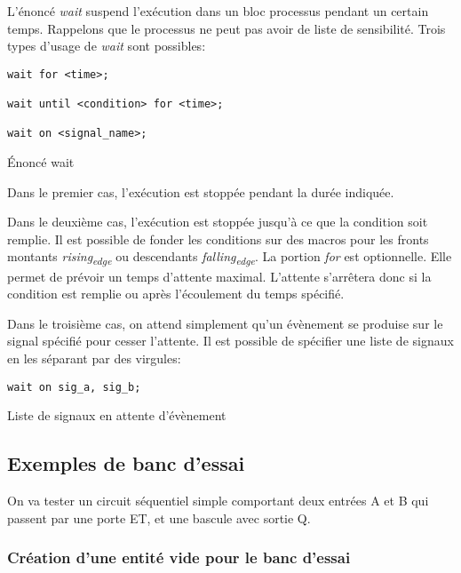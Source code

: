 \documentclass[11pt]{article}
\begin{document}
\begin{enumerate}
L'énoncé \emph{wait} suspend l'exécution dans un bloc processus pendant un
certain temps. Rappelons que le processus ne peut pas avoir de liste
de sensibilité. Trois types d'usage de \emph{wait} sont possibles:

\begin{listing}[htbp]
\begin{verbatim}
wait for <time>; 

wait until <condition> for <time>;

wait on <signal_name>;
\end{verbatim}
\caption{Énoncé wait}
\end{listing}

Dans le premier cas, l'exécution est stoppée pendant la durée
indiquée.

Dans le deuxième cas, l'exécution est stoppée jusqu'à ce que la
condition soit remplie. Il est possible de fonder les conditions sur
des macros pour les fronts montants \emph{rising\textsubscript{edge}} ou descendants
\emph{falling\textsubscript{edge}}. La portion \emph{for} est optionnelle. Elle permet de
prévoir un temps d'attente maximal. L'attente s'arrêtera donc si la
condition est remplie ou après l'écoulement du temps spécifié.

Dans le troisième cas, on attend simplement qu'un évènement se
produise sur le signal spécifié pour cesser l'attente. Il est possible
de spécifier une liste de signaux en les séparant par des virgules:

\begin{listing}[htbp]
\begin{verbatim}
wait on sig_a, sig_b;
\end{verbatim}
\caption{Liste de signaux en attente d'évènement}
\end{listing}
\end{enumerate}


\subsection{Exemples de banc d'essai}
\label{sec:orgabfb07a}

On va tester un circuit séquentiel simple comportant deux entrées A et
B qui passent par une porte ET, et une bascule avec sortie Q.

\subsubsection{Création d'une entité vide pour le banc d'essai}
\label{sec:org80dd8de}
\end{document}
